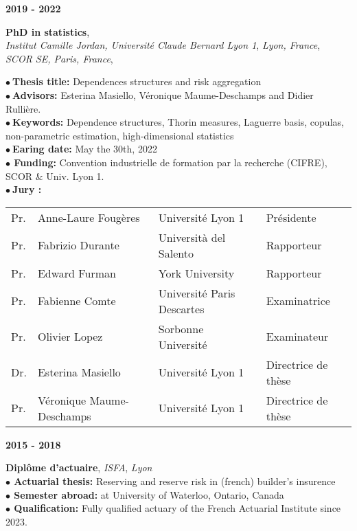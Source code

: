 \documentclass[a4paper,11pt]{article}
\newcommand{\tabcv}[2]{
\begin{minipage}[t]{0.12\linewidth}
\textbf{\footnotesize #1}
\end{minipage}\hfill
\begin{minipage}[t]{0.85\linewidth}
#2
\end{minipage}
\vspace{1em}
}
\begin{document}
\begin{flushleft}
\tabcv{2019 - 2022}{
\textbf{PhD in statistics},\\ \textit{Institut Camille Jordan, Université Claude Bernard Lyon 1}, \textit{Lyon, France}, \\ \textit{SCOR SE, Paris, France}, \textit{}\\[0.5em]
{\footnotesize \textbf{$\bullet\ $Thesis title:} {Dependences structures and risk aggregation}\\
\textbf{$\bullet\ $Advisors:} Esterina Masiello, Véronique Maume-Deschamps and Didier Rullière.\\
\textbf{$\bullet\ $Keywords:} {Dependence structures, Thorin measures, Laguerre basis, copulas, non-parametric estimation, high-dimensional statistics}\\
\textbf{$\bullet\ $Earing date:} May the 30th, 2022\\
\textbf{$\bullet$ Funding:} Convention industrielle de formation par la recherche (CIFRE), SCOR \& Univ. Lyon 1.\\
\textbf{$\bullet\ $Jury :} \\[0.25em]
\begin{tabular}{llll}
{Pr.} & {Anne-Laure Fougères}       & {Université Lyon 1} & {Présidente} \\
{Pr.} & {Fabrizio Durante}          & {Università del Salento} & {Rapporteur} \\
{Pr.} & {Edward Furman}             & {York University} & {Rapporteur} \\
{Pr.} & {Fabienne Comte}            & {Université Paris Descartes} & {Examinatrice} \\
{Pr.} & {Olivier Lopez}             & {Sorbonne Université} & {Examinateur} \\
{Dr.} & {Esterina Masiello}         & {Université Lyon 1} & {Directrice de thèse} \\
{Pr.} & {Véronique Maume-Deschamps} & {Université Lyon 1} & {Directrice de thèse} \\
\end{tabular}}
}

\tabcv{2015 - 2018}{
\textbf{Diplôme d'actuaire}, \textit{ISFA}, \textit{Lyon}\\[0.5em]
{\footnotesize \textbf{$\bullet$ Actuarial thesis:} Reserving and reserve risk in (french) builder's insurence\\
\footnotesize \textbf{$\bullet$ Semester abroad:} at University of Waterloo, Ontario, Canada\\
\footnotesize \textbf{$\bullet$ Qualification:} Fully qualified actuary of the French Actuarial Institute since 2023. 
}
}


\end{flushleft}
\end{document}
